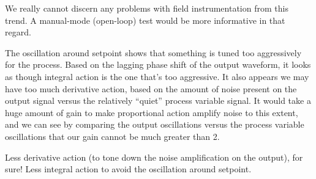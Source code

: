 \vskip 10pt

We really cannot discern any problems with field instrumentation from this trend.  A manual-mode (open-loop) test would be more informative in that regard.

\vskip 10pt

The oscillation around setpoint shows that something is tuned too aggressively for the process.  Based on the lagging phase shift of the output waveform, it looks as though integral action is the one that's too aggressive.  It also appears we may have too much derivative action, based on the amount of noise present on the output signal versus the relatively ``quiet'' process variable signal.  It would take a huge amount of gain to make proportional action amplify noise to this extent, and we can see by comparing the output oscillations versus the process variable oscillations that our gain cannot be much greater than 2.

\vskip 10pt

Less derivative action (to tone down the noise amplification on the output), for sure!  Less integral action to avoid the oscillation around setpoint.











